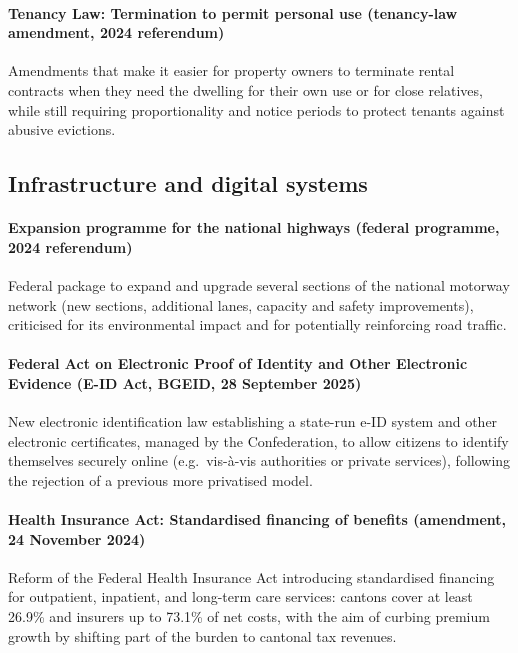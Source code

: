 \documentclass[11pt]{article}
\begin{document}
\paragraph{Tenancy Law: Termination to permit personal use (tenancy-law amendment, 2024 referendum)}
Amendments that make it easier for property owners to terminate rental contracts when they need the dwelling for their own use or for close relatives, while still requiring proportionality and notice periods to protect tenants against abusive evictions.

\subsection*{Infrastructure and digital systems}

\paragraph{Expansion programme for the national highways (federal programme, 2024 referendum)}
Federal package to expand and upgrade several sections of the national motorway network (new sections, additional lanes, capacity and safety improvements), criticised for its environmental impact and for potentially reinforcing road traffic.

\paragraph{Federal Act on Electronic Proof of Identity and Other Electronic Evidence (E-ID Act, BGEID, 28 September 2025)}
New electronic identification law establishing a state-run e-ID system and other electronic certificates, managed by the Confederation, to allow citizens to identify themselves securely online (e.g.\ vis-à-vis authorities or private services), following the rejection of a previous more privatised model.

\paragraph{Health Insurance Act: Standardised financing of benefits (amendment, 24 November 2024)}
Reform of the Federal Health Insurance Act introducing standardised financing for outpatient, inpatient, and long-term care services: cantons cover at least 26.9\% and insurers up to 73.1\% of net costs, with the aim of curbing premium growth by shifting part of the burden to cantonal tax revenues.
\end{document}
